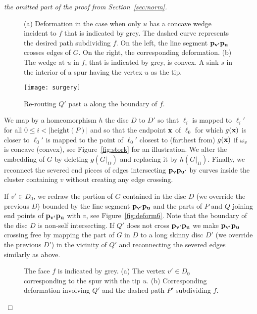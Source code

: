 \documentclass{llncs}
\def\length{\mathrm{height}}
\begin{document}
\begin{proof}[the omitted part of the proof from Section~\ref{sec:norm}]
\begin{figure}[h]
\caption{(a) Deformation in the case when only $u$ has a concave wedge incident to $f$ that is indicated by grey.
The dashed curve represents the desired path subdividing $f$.
On the left, the line segment ${\bf p_{v'}p_{u}}$ crosses  edges of $G$. 
On the right, the corresponding deformation. (b) The wedge at $u$
in $f$, that is indicated by grey, is convex.  A sink $s$  in the interior of a spur having the vertex $u$
as the tip.}
\end{figure}




\begin{figure}
 \centering
\texttt{[image: surgery]}
\caption{Re-routing $Q'$ past $u$ along the boundary of $f$.}
\label{fig:deform8} 
\end{figure}

We map by a homeomorphism $h$ the disc $D$ to $D'$ so that $\ell_i$
is mapped to $\ell_i'$ for all $0\leq i<|\length(P)|$
and so that the endpoint ${\bf x}$ of $\ell_0$ for which $g({\bf x})$ is closer to $\ell_0'$ is mapped to the point of $\ell_0'$ closest to (farthest from) 
$g({\bf x})$ if $\omega_v$ is concave (convex), see Figure~\ref{fig:stork} for an illustration.
We alter the embedding of $G$ by deleting $g(G|_D)$ and replacing it
by $h(G|_D)$.
Finally, we  reconnect the severed end pieces of edges intersecting ${\bf p_vp_{u'}}$ by curves inside the cluster containing $v$ without
creating any edge crossing. 



If $v'\in D_0$, we redraw the portion of $G$ contained in the disc $D$ (we override the previous $D$) bounded by the line segment ${\bf p_{v'}p_u}$
and the parts of $P$ and $Q$ joining end points of ${\bf p_{v'}p_u}$  with $v$, see Figure~\ref{fig:deform6}.
Note that the boundary of the disc $D$ is non-self intersecting.
If $Q'$ does not cross ${\bf p_{v'}p_u}$ we make ${\bf p_{v'}p_u}$ crossing free by mapping
the part of $G$ in $D$ to a long skinny disc $D'$  (we override the previous $D'$) in the vicinity of $Q'$ and reconnecting the severed edges similarly 
as above.

 \begin{figure}
  \centering
\centering
{}
    	\hspace{1px}
\caption{The face $f$ is indicated by grey. (a) The vertex  $v'\in D_0$ corresponding to the spur with the tip $u$. (b) Corresponding  deformation involving $Q'$ and the dashed path $P'$ subdividing $f$.}
\end{figure}




\end{proof}
\end{document}

